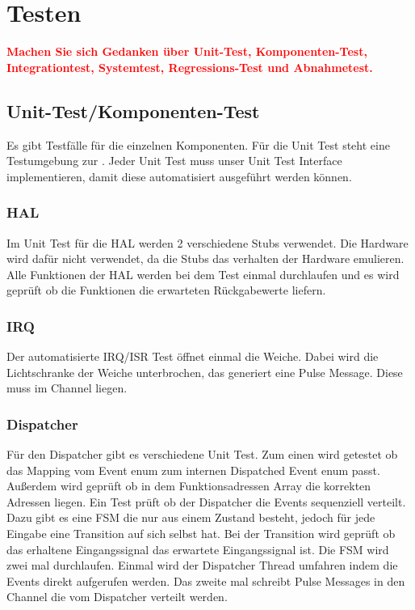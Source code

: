 \documentclass[oneside,a4paper,titlepage]{scrartcl} %
\begin{document}
\section{Testen}
\textcolor{red}{\textbf{Machen Sie sich Gedanken über Unit-Test, Komponenten-Test,
Integrationtest, Systemtest, Regressions-Test und Abnahmetest.}}

\subsection{Unit-Test/Komponenten-Test}
Es gibt Testfälle für die einzelnen Komponenten. Für die Unit Test steht eine Testumgebung zur 
.
Jeder Unit Test muss unser Unit Test Interface implementieren, damit diese automatisiert ausgeführt werden
können.

\subsubsection{HAL}
Im Unit Test für die HAL werden 2 verschiedene Stubs verwendet. Die Hardware wird dafür nicht verwendet,
da die Stubs das verhalten der Hardware emulieren. Alle Funktionen der HAL werden bei dem Test einmal durchlaufen
und es wird geprüft ob die Funktionen die erwarteten Rückgabewerte liefern.

\subsubsection{IRQ}
Der automatisierte IRQ/ISR Test öffnet einmal die Weiche. Dabei wird die Lichtschranke der Weiche unterbrochen,
das generiert eine Pulse Message. Diese muss im Channel liegen.

\subsubsection{Dispatcher}
Für den Dispatcher gibt es verschiedene Unit Test. Zum einen wird getestet
ob das Mapping vom Event enum zum internen Dispatched Event enum passt.
Außerdem wird geprüft ob in dem Funktionsadressen Array die korrekten Adressen liegen.
Ein Test prüft ob der Dispatcher die Events sequenziell verteilt. Dazu gibt es eine
FSM die nur aus einem Zustand besteht, jedoch für jede Eingabe eine Transition auf sich selbst hat.
Bei der Transition wird geprüft ob das erhaltene Eingangssignal das erwartete Eingangssignal ist.
Die FSM wird zwei mal durchlaufen. Einmal wird der Dispatcher Thread umfahren indem die Events
direkt aufgerufen werden. Das zweite mal schreibt Pulse Messages in den Channel die vom Dispatcher
verteilt werden.
\end{document}
